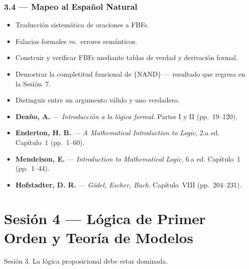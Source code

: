 \documentclass[11pt, letterpaper]{article}
\begin{document}
\subsubsection{3.4 --- Mapeo al Espa\~nol Natural}
\begin{itemize}
  \item Traducci\'on sistem\'atica de oraciones a FBFs.
  \item Falacias formales vs.\ errores sem\'anticos.
\end{itemize}

\begin{objetivos}
\begin{itemize}
  \item Construir y verificar FBFs mediante tablas de verdad y derivaci\'on formal.
  \item Demostrar la completitud funcional de $\{\text{NAND}\}$ --- resultado que regresa en la Sesi\'on~7.
  \item Distinguir entre un argumento v\'alido y uno verdadero.
\end{itemize}
\end{objetivos}

\begin{lecturas}
\begin{itemize}
  \item[$(\star)$] \textbf{Deaño, A.} --- \emph{Introducci\'on a la l\'ogica formal}. Partes I y II (pp.\ 19--120).
  \item[$(\star)$] \textbf{Enderton, H. B.} --- \emph{A Mathematical Introduction to Logic}, 2.a ed. Cap\'itulo~1 (pp.\ 1--60).
  \item \textbf{Mendelson, E.} --- \emph{Introduction to Mathematical Logic}, 6.a ed. Cap\'itulo~1 (pp.\ 1--44).
  \item \textbf{Hofstadter, D. R.} --- \emph{G\"odel, Escher, Bach}. Cap\'itulo~VIII (pp.\ 204--231).
\end{itemize}
\end{lecturas}

\newpage

\section{Sesi\'on 4 --- L\'ogica de Primer Orden y Teor\'ia de Modelos}

\begin{prereqs}
Sesi\'on 3. La l\'ogica proposicional debe estar dominada.
\end{prereqs}
\end{document}
